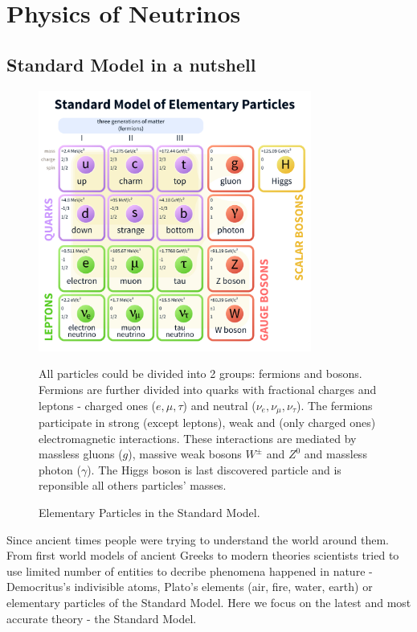 \chapter{Physics of Neutrinos}
\label{neutrino_physics_chapter}

\section{Standard Model in a nutshell}
\begin{figure}
\includegraphics[width=0.8\textwidth]{figures/Standard_Model_of_Elementary_Particles.png}
\centering
\caption{Elementary Particles in the Standard Model.} 
All particles could be divided into 2 groups: fermions and bosons. Fermions are 
further divided into quarks with fractional charges and leptons - charged ones ($e, \mu, \tau$)
and neutral ($\nu_e, \nu_\mu, \nu_{\tau}$). The fermions participate in strong (except leptons), 
weak and (only charged ones) electromagnetic interactions. These interactions are 
mediated by massless gluons ($g$), massive weak bosons $W^{\pm}$ and $Z^0$ and massless
photon ($\gamma$). The Higgs boson is last discovered particle and is reponsible all others 
particles' masses.
\end{figure}
Since ancient times people were trying to understand the world around them. From 
first world models of ancient Greeks to modern theories scientists tried to use 
limited number of entities to decribe phenomena happened in nature - Democritus's 
indivisible atoms, Plato's elements (air, fire, water, earth) or elementary particles 
of the Standard Model. Here we focus on the latest and most accurate theory - the
Standard Model.

